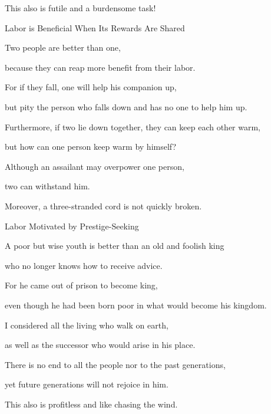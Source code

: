 {\par }{\Q This
also
is futile
and a burdensome
task!
\par }{\SH Labor is Beneficial When Its Rewards Are Shared
\par }{\Q {}Two
people are better
than one,
\par }{\Q because they can reap
more benefit
from their labor.
\par }{\Q {}For
if
they fall,
one
will help
his companion
up,
\par }{\Q but pity
the person
who falls down
and has no
one
to help
him up.
\par }{\Q {}Furthermore,
if
two lie
down together, they can keep each other
warm,
\par }{\Q but how
can one
person keep warm by himself?
\par }{\Q {}Although
an assailant
may overpower one
person,
\par }{\Q two
can withstand
him.
\par }{\Q Moreover, a three-stranded
cord
is not
quickly
broken.
\par }{\SH Labor Motivated by Prestige-Seeking
\par }{\Q {}A poor
but wise
youth
is better
than an old
and foolish
king
\par }{\Q who
no
longer
knows
how to receive advice.
\par }{\Q {}For
he came out
of prison
to become king,
\par }{\Q even
though he had been born
poor
in what would become his kingdom.
\par }{\Q {}I considered
all
the living
who walk
on
earth,
\par }{\Q as well
as the successor
who
would arise
in his place.
\par }{\Q {}There is no
end
to all
the people
nor to the past generations,

\par }{\Q yet
future generations will not
rejoice
in him.
\par }{\Q This
also
is profitless
and like chasing
the wind.

}
